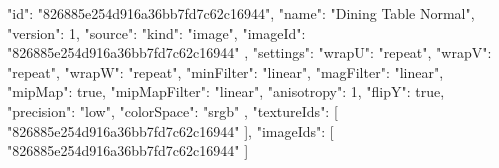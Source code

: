 {
  "id": "826885e254d916a36bb7fd7c62c16944",
  "name": "Dining Table Normal",
  "version": 1,
  "source": {
    "kind": "image",
    "imageId": "826885e254d916a36bb7fd7c62c16944"
  },
  "settings": {
    "wrapU": "repeat",
    "wrapV": "repeat",
    "wrapW": "repeat",
    "minFilter": "linear",
    "magFilter": "linear",
    "mipMap": true,
    "mipMapFilter": "linear",
    "anisotropy": 1,
    "flipY": true,
    "precision": "low",
    "colorSpace": "srgb"
  },
  "textureIds": [
    "826885e254d916a36bb7fd7c62c16944"
  ],
  "imageIds": [
    "826885e254d916a36bb7fd7c62c16944"
  ]
}
